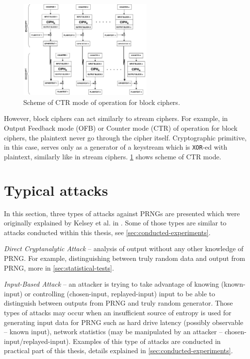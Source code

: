 \documentclass[
    digital,    %
    oneside,    %
    color,
    11pt,
    nocover,
    notable,
    nolof,
    nolot,
    final
]{fithesis3}
\renewcommand\_{\textunderscore\allowbreak}
\begin{document}
\begin{figure}[!h]
	\centering
	\includegraphics[width=0.6\textwidth]{./images/pictures/ctr.png}
	\caption{Scheme of CTR mode of operation for block ciphers. \cite{Dworkin:2001:SER:2206247}}
	\label{fig:ctr}
\end{figure}

However, block ciphers can act similarly to stream ciphers. For example, in Output Feedback mode (OFB) or Counter mode (CTR) of operation for block ciphers, the plaintext never go through the cipher itself. Cryptographic primitive, in this case, serves only as a generator of a keystream which is \texttt{XOR}-ed with plaintext, similarly like in stream ciphers. \cref{fig:ctr} shows scheme of CTR mode.\cite{Dworkin:2001:SER:2206247}

\section{Typical attacks}

In this section, three types of attacks against PRNGs are presented which were originally explained by Kelsey et al. in \cite{kelsey1998cryptanalytic}. Some of those types are similar to attacks conducted within this thesis, see \cref{sec:conducted-experiments}.

\textit{Direct Cryptanalytic Attack} -- analysis of output without any other knowledge of PRNG. For example, distinguishing between truly random data and output from PRNG, more in \cref{sec:statistical-tests}.

\textit{Input-Based Attack} -- an attacker is trying to take advantage of knowing (known-input) or controlling (chosen-input, replayed-input) input to be able to distinguish between outputs from PRNG and truly random generator. Those types of attacks may occur when an insufficient source of entropy is used for generating input data for PRNG such as hard drive latency (possibly observable -- known input), network statistics (may be manipulated by an attacker -- chosen-input/replayed-input). Examples of this type of attacks are conducted in practical part of this thesis, details explained in \cref{sec:conducted-experiments}.
\end{document}
